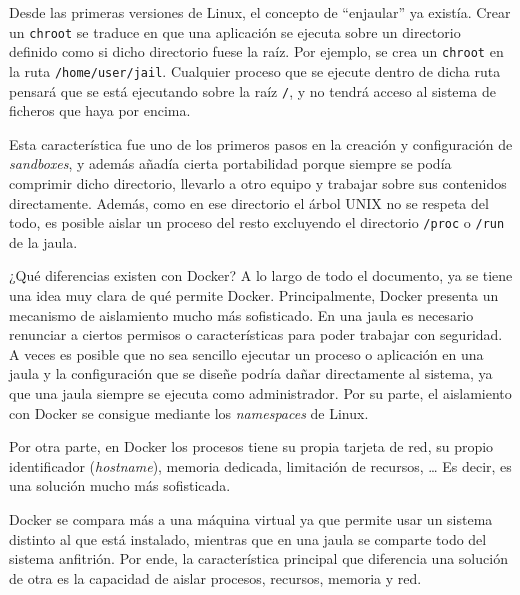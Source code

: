 Desde las primeras versiones de Linux, el concepto de ``enjaular'' ya existía.
Crear un \texttt{chroot} se traduce en que una aplicación se ejecuta sobre
un directorio definido como si dicho directorio fuese la raíz. Por ejemplo,
se crea un \texttt{chroot} en la ruta \texttt{/home/user/jail}. Cualquier
proceso que se ejecute dentro de dicha ruta pensará que se está ejecutando
sobre la raíz \texttt{/}, y no tendrá acceso al sistema de ficheros que haya
por encima.

Esta característica fue uno de los primeros pasos en la creación y configuración
de \textit{sandboxes}, y además añadía cierta portabilidad porque siempre se
podía comprimir dicho directorio, llevarlo a otro equipo y trabajar sobre
sus contenidos directamente. Además, como en ese directorio el árbol UNIX
no se respeta del todo, es posible aislar un proceso del resto
excluyendo el directorio \texttt{/proc} o \texttt{/run} de la jaula.

¿Qué diferencias existen con Docker? A lo largo de todo el documento, ya
se tiene una idea muy clara de qué permite Docker. Principalmente, Docker presenta
un mecanismo de aislamiento mucho más sofisticado. En una jaula es necesario
renunciar a ciertos permisos o características para poder trabajar con
seguridad. A veces es posible que no sea sencillo ejecutar un proceso o aplicación
en una jaula y la configuración que se diseñe podría dañar directamente al sistema,
ya que una jaula siempre se ejecuta como administrador. Por su parte, el aislamiento
con Docker se consigue mediante los \textit{namespaces} de Linux.

Por otra parte, en Docker los procesos tiene su propia tarjeta de red, su propio
identificador (\textit{hostname}), memoria dedicada, limitación de recursos, \dots
Es decir, es una solución mucho más sofisticada.

Docker se compara más a una máquina virtual ya que permite usar un sistema
distinto al que está instalado, mientras que en una jaula se comparte
todo del sistema anfitrión. Por ende, la característica principal que diferencia una
solución de otra es la capacidad de aislar procesos, recursos, memoria y red.